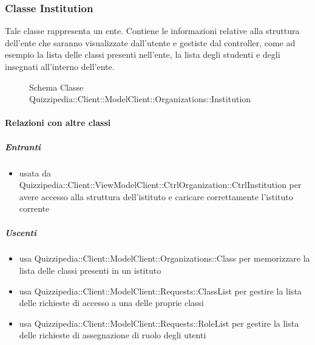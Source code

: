 \subsubsection{Classe Institution}
Tale classe rappresenta un ente. Contiene le informazioni relative alla struttura dell'ente che saranno visualizzate dall'utente e gestiste dal controller, come ad esempio la lista delle classi presenti nell'ente, la lista degli studenti e degli insegnati all'interno dell'ente.
\begin{figure}[H]
\centering
\noindent{}
\caption[Schema Classe Institution]{Schema Classe Quizzipedia::Client::ModelClient::Organizations::Institution}
\end{figure}
\paragraph{Relazioni con altre classi}
\subparagraph{Entranti}
\begin{itemize}
\item usata da Quizzipedia::Client::ViewModelClient::CtrlOrganization::CtrlInstitution per avere accesso alla struttura dell'istituto e caricare correttamente l'istituto corrente
\end{itemize}
\subparagraph{Uscenti}
\begin{itemize}
\item usa Quizzipedia::Client::ModelClient::Organizations::Class per memorizzare la lista delle classi presenti in un istituto
\item usa Quizzipedia::Client::ModelClient::Requests::ClassList per gestire la lista delle richieste di accesso a una delle proprie classi
\item usa Quizzipedia::Client::ModelClient::Requests::RoleList per gestire la lista delle richieste di assegnazione di ruolo degli utenti
\end{itemize}
